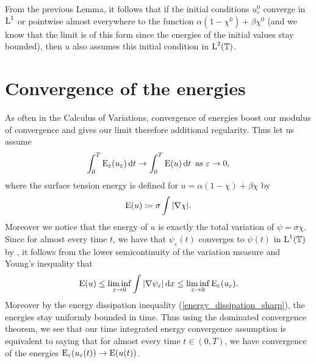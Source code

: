 \begin{remark}
	From the previous Lemma, it follows that if the initial conditions $ u_{ \varepsilon }^{ 0 } $ converge in $ \operatorname{L}^{ 1 } $ or pointwise almost everywhere to the function $ \alpha ( 1 - \chi^{ 0 } ) + \beta \chi^{ 0 } $ (and we know that the limit is of this form since the energies of the initial values stay bounded), then $ u $ also assumes this initial condition in $ \operatorname{L}^{ 2 } ( \operatorname{\mathbb{T}} ) $.
\end{remark}

\section{Convergence of the energies}

As often in the Calculus of Variations, convergence of energies boost our modulus of convergence and gives our limit therefore additional regularity. 
Thus let us assume 
\begin{equation}
	\label{energy_convergence}
	\int_{ 0 }^{ T }
		\operatorname{E}_{ \varepsilon } ( u_{ \varepsilon } ) 
	\dd{ t }
	\to 
	\int_{ 0 }^{ T }
		\operatorname{E} ( u )
	\dd{ t }
	\text{ as }
	\varepsilon \to 0,
\end{equation}
where the surface tension energy is defined for $ u = \alpha ( 1 - \chi ) + \beta \chi $ by 
\begin{equation}
	\operatorname{E} ( u ) 
	\coloneqq
	\sigma \int \abs{ \nabla \chi }.
\end{equation}
Moreover we notice that the energy of $ u $ is exactly the total variation of $ \psi = \sigma \chi $.
Since for almost every time $ t $, we have that $ \psi_{ \varepsilon } ( t ) $ converges to $ \psi ( t ) $ in $ \operatorname{L}^{ 1 }  ( \operatorname{\mathbb{T}} ) $ by , it follows from the lower semicontinuity of the variation measure and Young's inequality that
\begin{equation*}
	\operatorname{E} ( u ) 
	\leq
	\liminf_{ \varepsilon \to 0 }
	\int
		\abs{ \nabla \psi_{ \varepsilon } }
	\dd{ x }
	\leq
	\liminf_{ \varepsilon \to 0 }
		\operatorname{E}_{ \varepsilon } ( u_{ \varepsilon } ).
\end{equation*}
Moreover by the energy dissipation inequality (\ref{energy_dissipation_sharp}), the energies stay uniformly bounded in time. Thus using the dominated convergence theorem, we see that our time integrated energy convergence assumption is equivalent to saying that for almost every time $ t \in ( 0, T ) $, we have convergence of the energies $ \operatorname{E}_{ \varepsilon } ( u_{ \varepsilon } ( t ) ) \to \operatorname{E} ( u ( t ) ) $.

